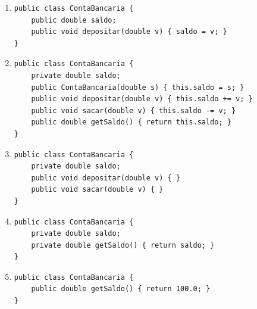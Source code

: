 \documentclass[12pt,a4paper]{article}
\begin{document}
\begin{enumerate}
    \begin{center} 
    \end{center}

    \begin{enumerate}[label=\Alph*)]
        \item \begin{lstlisting}
public class ContaBancaria {
    public double saldo;
    public void depositar(double v) { saldo = v; }
}
        \end{lstlisting}
        \item \begin{lstlisting}
public class ContaBancaria {
    private double saldo;
    public ContaBancaria(double s) { this.saldo = s; }
    public void depositar(double v) { this.saldo += v; }
    public void sacar(double v) { this.saldo -= v; }
    public double getSaldo() { return this.saldo; }
}
        \end{lstlisting}
        \item \begin{lstlisting}
public class ContaBancaria {
    private double saldo;
    public void depositar(double v) { }
    public void sacar(double v) { }
}
        \end{lstlisting}
        \item \begin{lstlisting}
public class ContaBancaria {
    private double saldo;
    private double getSaldo() { return saldo; }
}
        \end{lstlisting}
        \item \begin{lstlisting}
public class ContaBancaria {
    public double getSaldo() { return 100.0; }
}
        \end{lstlisting}
    \end{enumerate}


\end{enumerate}
\end{document}
